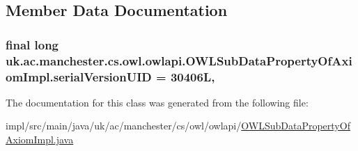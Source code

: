 \subsection{Member Data Documentation}
\hypertarget{classuk_1_1ac_1_1manchester_1_1cs_1_1owl_1_1owlapi_1_1_o_w_l_sub_data_property_of_axiom_impl_ae2ba056491e03bc42d2d59bbb7b586e9}{
\subsubsection[{serial\-Version\-U\-I\-D}]{\setlength{\rightskip}{0pt plus 5cm}final long uk.\-ac.\-manchester.\-cs.\-owl.\-owlapi.\-O\-W\-L\-Sub\-Data\-Property\-Of\-Axiom\-Impl.\-serial\-Version\-U\-I\-D = 30406\-L\hspace{0.3cm}{\ttfamily [static]}, {\ttfamily [private]}}}\label{classuk_1_1ac_1_1manchester_1_1cs_1_1owl_1_1owlapi_1_1_o_w_l_sub_data_property_of_axiom_impl_ae2ba056491e03bc42d2d59bbb7b586e9}


The documentation for this class was generated from the following file\-:\begin{DoxyCompactItemize}
\item 
impl/src/main/java/uk/ac/manchester/cs/owl/owlapi/\hyperlink{_o_w_l_sub_data_property_of_axiom_impl_8java}{O\-W\-L\-Sub\-Data\-Property\-Of\-Axiom\-Impl.\-java}\end{DoxyCompactItemize}
